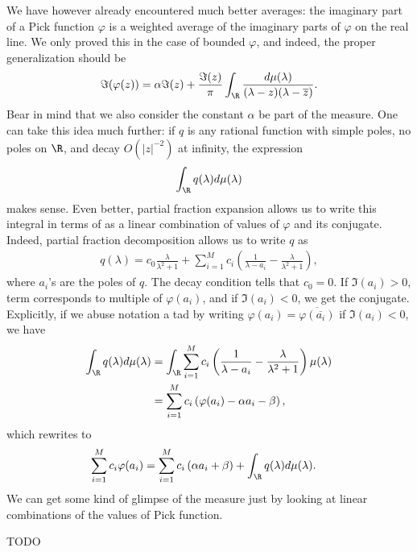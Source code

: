 We have however already encountered much better averages: the imaginary part of a Pick function $\varphi$ is a weighted average of the imaginary parts of $\varphi$ on the real line. We only proved this in the case of bounded $\varphi$, and indeed, the proper generalization should be 
\begin{align*}
	\Im(\varphi(z)) = \alpha \Im(z) + \frac{\Im(z)}{\pi}\int_{\R} \frac{d \mu(\lambda)}{(\lambda - z)(\lambda - \overline{z})}.
\end{align*}
Bear in mind that we also consider the constant $\alpha$ be part of the measure. One can take this idea much further: if $q$ is any rational function with simple poles, no poles on $\R$, and decay $O(|z|^{-2})$ at infinity, the expression
\begin{align*}
	\int_{\R} q(\lambda) d \mu(\lambda)
\end{align*}
makes sense. Even better, partial fraction expansion allows us to write this integral in terms of as a linear combination of values of $\varphi$ and its conjugate. Indeed, partial fraction decomposition allows us to write $q$ as
\begin{align*}
	q(\lambda) = c_{0}\frac{\lambda}{\lambda^2 + 1} + \sum_{i = 1}^{M} c_{i} \left(\frac{1}{\lambda - a_{i}} - \frac{\lambda}{\lambda^2 + 1}\right),
\end{align*}
where $a_{i}$'s are the poles of $q$. The decay condition tells that $c_{0} = 0$. If $\Im(a_{i}) > 0$, term corresponds to multiple of $\varphi(a_{i})$, and if $\Im(a_{i}) < 0$, we get the conjugate. Explicitly, if we abuse notation a tad by writing $\varphi(a_{i}) = \overline{\varphi(\overline{a_{i}})}$ if $\Im(a_{i}) < 0$, we have
\begin{align*}
	\int_{\R} q(\lambda) d \mu(\lambda) &= \int_{\R} \sum_{i = 1}^{M} c_{i} \left(\frac{1}{\lambda - a_{i}} - \frac{\lambda}{\lambda^2 + 1}\right)\mu(\lambda) \\
	&= \sum_{i = 1}^{M} c_{i} \left(\varphi(a_{i}) - \alpha a_{i} - \beta\right),
\end{align*}
which rewrites to
\begin{align*}
	\sum_{i = 1}^{M} c_{i} \varphi(a_{i}) &= \sum_{i = 1}^{M} c_{i} \left(\alpha a_{i} + \beta\right) + \int_{\R} q(\lambda) d \mu(\lambda).
\end{align*}
We can get some kind of glimpse of the measure just by looking at linear combinations of the values of Pick function.

TODO






